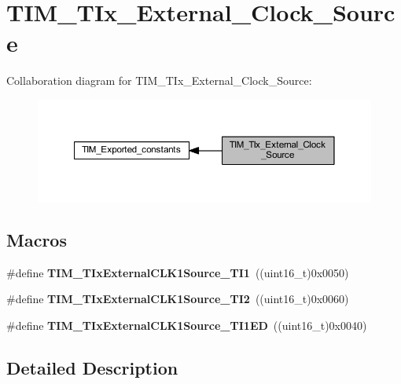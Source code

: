 \hypertarget{group___t_i_m___t_ix___external___clock___source}{}\section{T\+I\+M\+\_\+\+T\+Ix\+\_\+\+External\+\_\+\+Clock\+\_\+\+Source}
\label{group___t_i_m___t_ix___external___clock___source}
Collaboration diagram for T\+I\+M\+\_\+\+T\+Ix\+\_\+\+External\+\_\+\+Clock\+\_\+\+Source\+:
\nopagebreak
\begin{figure}[H]
\begin{center}
\leavevmode
\includegraphics[width=350pt]{group___t_i_m___t_ix___external___clock___source}
\end{center}
\end{figure}
\subsection*{Macros}
\begin{DoxyCompactItemize}
\item 
\mbox{\label{group___t_i_m___t_ix___external___clock___source_ga237daecde6e1f75509acc80a9ccce820}} 
\#define {\bfseries T\+I\+M\+\_\+\+T\+Ix\+External\+C\+L\+K1\+Source\+\_\+\+T\+I1}~((uint16\+\_\+t)0x0050)
\item 
\mbox{\label{group___t_i_m___t_ix___external___clock___source_gafa3c6345a7e1c3668b2e7e4d61a79491}} 
\#define {\bfseries T\+I\+M\+\_\+\+T\+Ix\+External\+C\+L\+K1\+Source\+\_\+\+T\+I2}~((uint16\+\_\+t)0x0060)
\item 
\mbox{\label{group___t_i_m___t_ix___external___clock___source_gaa1a749bc38d434902b69a45d50ee0889}} 
\#define {\bfseries T\+I\+M\+\_\+\+T\+Ix\+External\+C\+L\+K1\+Source\+\_\+\+T\+I1\+ED}~((uint16\+\_\+t)0x0040)
\end{DoxyCompactItemize}


\subsection{Detailed Description}
